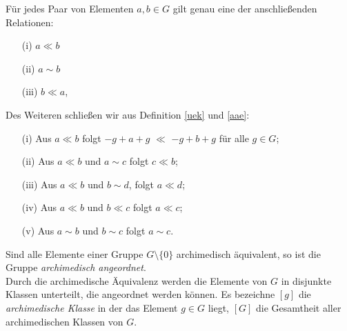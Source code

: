 \begin{folg}
Für jedes Paar von Elementen $a, b \in G$ gilt genau eine der anschließenden Relationen: 
\begin{multicols}{3}
\begin{enumerate}
\item[(i)] $a \ll b$
\item[(ii)] $a \sim b$
\item[(iii)] $b \ll a$, 
\end{enumerate}
\end{multicols}
%
Des Weiteren schließen wir aus Definition \ref{uek} und \ref{aae}:
\begin{enumerate}
\item[(i)] Aus $a \ll b$ folgt $-g+a+g $ $\ll$ $-g+b+g$ für alle $g \in G$;
\item[(ii)] Aus $a \ll b$ und $a \sim c$ folgt $c \ll b$;
\item[(iii)] Aus $a \ll b$ und $b \sim d$, folgt $a \ll d$;
\item[(iv)] Aus $a \ll b$ und $b \ll c$ folgt $a \ll c$;
\item[(v)] Aus $a \sim b$ und $b \sim c$ folgt $a \sim c$.
\end{enumerate}
Sind alle Elemente einer Gruppe $G\setminus\lbrace 0 \rbrace$ archimedisch äquivalent, so ist die Gruppe \textit{archimedisch angeordnet}. \\ 
Durch die archimedische Äquivalenz werden die Elemente von $G$ in disjunkte Klassen unterteilt, die angeordnet werden können. Es bezeichne $[g]$ die \textit{archimedische Klasse} in der das Element $g \in G$ liegt, $[G]$ die Gesamtheit aller archimedischen Klassen von $G$. \label{archimedischeKlassen}\\
\end{folg}
%
%
%
